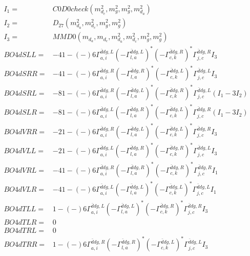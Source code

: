 \documentclass[A4,landscape]{article}
\begin{document}
\begin{align} 
I_1 = & C0D0check(m^2_{d_{{c}}}, m^2_{g}, m^2_{g}, m^2_{d_{{a}}}) \\ 
I_2 = & D_{27}(m^2_{d_{{a}}}, m^2_{d_{{c}}}, m^2_{g}, m^2_{g}) \\ 
I_3 = & MMD0(m_{d_{{a}}}, m_{d_{{c}}}, m^2_{d_{{a}}}, m^2_{d_{{c}}}, m^2_{g}, m^2_{g}) \\ 
  BO4dSLL= & -4   1
-(-)
  6 \Gamma^{\bar{d}d g ,L}_{a, i} (- \Gamma^{\bar{d}d g ,L} _{l, a})^* (- \Gamma^{\bar{d}d g ,R} _{c, k})^* \Gamma^{\bar{d}d g ,R}_{j, c} I_3 \\ 
  BO4dSRR= & -4   1
-(-)
  6 \Gamma^{\bar{d}d g ,R}_{a, i} (- \Gamma^{\bar{d}d g ,R} _{l, a})^* (- \Gamma^{\bar{d}d g ,L} _{c, k})^* \Gamma^{\bar{d}d g ,L}_{j, c} I_3 \\ 
  BO4dSRL= & -8   1
-(-)
  6 \Gamma^{\bar{d}d g ,R}_{a, i} (- \Gamma^{\bar{d}d g ,L} _{l, a})^* (- \Gamma^{\bar{d}d g ,R} _{c, k})^* \Gamma^{\bar{d}d g ,L}_{j, c} (I_1 - 3 I_2) \\ 
  BO4dSLR= & -8   1
-(-)
  6 \Gamma^{\bar{d}d g ,L}_{a, i} (- \Gamma^{\bar{d}d g ,R} _{l, a})^* (- \Gamma^{\bar{d}d g ,L} _{c, k})^* \Gamma^{\bar{d}d g ,R}_{j, c} (I_1 - 3 I_2) \\ 
  BO4dVRR= & -2   1
-(-)
  6 \Gamma^{\bar{d}d g ,R}_{a, i} (- \Gamma^{\bar{d}d g ,L} _{l, a})^* (- \Gamma^{\bar{d}d g ,L} _{c, k})^* \Gamma^{\bar{d}d g ,R}_{j, c} I_3 \\ 
  BO4dVLL= & -2   1
-(-)
  6 \Gamma^{\bar{d}d g ,L}_{a, i} (- \Gamma^{\bar{d}d g ,R} _{l, a})^* (- \Gamma^{\bar{d}d g ,R} _{c, k})^* \Gamma^{\bar{d}d g ,L}_{j, c} I_3 \\ 
  BO4dVRL= & -4   1
-(-)
  6 \Gamma^{\bar{d}d g ,R}_{a, i} (- \Gamma^{\bar{d}d g ,R} _{l, a})^* (- \Gamma^{\bar{d}d g ,R} _{c, k})^* \Gamma^{\bar{d}d g ,R}_{j, c} I_1 \\ 
  BO4dVLR= & -4   1
-(-)
  6 \Gamma^{\bar{d}d g ,L}_{a, i} (- \Gamma^{\bar{d}d g ,L} _{l, a})^* (- \Gamma^{\bar{d}d g ,L} _{c, k})^* \Gamma^{\bar{d}d g ,L}_{j, c} I_1 \\ 
  BO4dTLL= &   1
-(-)
  6 \Gamma^{\bar{d}d g ,L}_{a, i} (- \Gamma^{\bar{d}d g ,L} _{l, a})^* (- \Gamma^{\bar{d}d g ,R} _{c, k})^* \Gamma^{\bar{d}d g ,R}_{j, c} I_3 \\ 
  BO4dTLR= & 0 \\ 
  BO4dTRL= & 0 \\ 
  BO4dTRR= &   1
-(-)
  6 \Gamma^{\bar{d}d g ,R}_{a, i} (- \Gamma^{\bar{d}d g ,R} _{l, a})^* (- \Gamma^{\bar{d}d g ,L} _{c, k})^* \Gamma^{\bar{d}d g ,L}_{j, c} I_3 \\ 
\end{align} 
\end{document}
